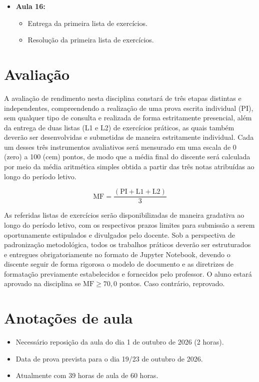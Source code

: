 \begin{itemize}
    \item \textbf{Aula 16:}
    \begin{itemize}
        \item Entrega da primeira lista de exercícios.
        \item Resolução da primeira lista de exercícios.
    \end{itemize}

\end{itemize}



\section*{Avaliação}

A avaliação de rendimento nesta disciplina constará de três etapas distintas e independentes, compreendendo a realização de uma prova escrita individual (PI), sem qualquer tipo de consulta e realizada de forma estritamente presencial, além da entrega de duas listas (L1 e L2) de exercícios práticos, as quais também deverão ser desenvolvidas e submetidas de maneira estritamente individual. Cada um desses três instrumentos avaliativos será mensurado em uma escala de 0 (zero) a 100 (cem) pontos, de modo que a média final do discente será calculada por meio da média aritmética simples obtida a partir das três notas atribuídas ao longo do período letivo.

$$\text{MF} = \frac{(\text{PI} + \text{L1} + \text{L2})}{3}$$

As referidas listas de exercícios serão disponibilizadas de maneira gradativa ao longo do período letivo, com os respectivos prazos limites para submissão a serem oportunamente estipulados e divulgados pelo docente. Sob a perspectiva de padronização metodológica, todos os trabalhos práticos deverão ser estruturados e entregues obrigatoriamente no formato de Jupyter Notebook, devendo o discente seguir de forma rigorosa o modelo de documento e as diretrizes de formatação previamente estabelecidos e fornecidos pelo professor. O aluno estará aprovado na disciplina se $\text{MF}\geq 70,0$ pontos. Caso contrário, reprovado.


\section*{Anotações de aula}

\begin{itemize}
    \item Necessário reposição da aula do dia 1 de outubro de 2026 (2 horas).
    \item Data de prova prevista para o dia 19/23 de outubro de 2026.
    \item Atualmente com 39 horas de aula de 60 horas.
\end{itemize}

